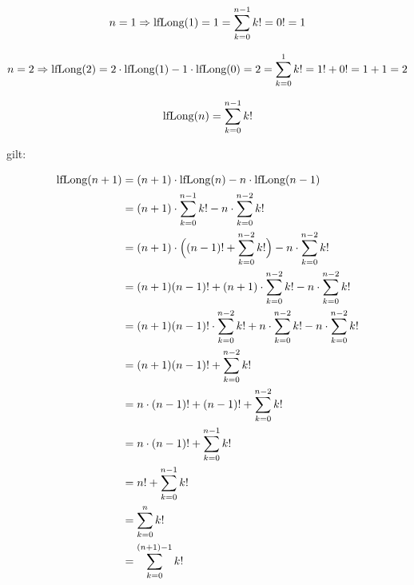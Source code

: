 \documentclass{lehramt-informatik-aufgabe}
\begin{document}
\begin{enumerate}
\begin{liAntwort}

%

\liInduktionAnfang

\begin{displaymath}
n=1 \Rightarrow
\text{lfLong}(1) =
1 =
\sum^{n-1}_{k=0}k! =
0! =
1
\end{displaymath}

\begin{displaymath}
n=2 \Rightarrow
\text{lfLong}(2) =
2 \cdot \text{lfLong}(1) - 1 \cdot \text{lfLong}(0) =
2 =
\sum^{1}_{k=0}k! =
1! + 0! =
1 + 1 =
2
\end{displaymath}

%

\liInduktionVoraussetzung

\begin{displaymath}
\text{lfLong}(n) = \sum^{n-1}_{k=0}k!
\end{displaymath}

gilt:

%

\liInduktionSchritt

\begin{equation}
\begin{split}
\text{lfLong}(n+1) & = (n+1) \cdot \text{lfLong}(n) - n \cdot \text{lfLong}(n-1) \\
& = (n+1) \cdot \sum^{n-1}_{k=0}k! - n \cdot \sum^{n-2}_{k=0}k! \\
& = (n+1) \cdot \Big((n-1)! + \sum^{n-2}_{k=0}k!\Big) - n \cdot \sum^{n-2}_{k=0}k! \\
& = (n+1)(n-1)! + (n+1) \cdot \sum^{n-2}_{k=0}k! - n \cdot \sum^{n-2}_{k=0}k! \\
& = (n+1)(n-1)! \cdot \sum^{n-2}_{k=0}k! + n \cdot \sum^{n-2}_{k=0}k! - n \cdot \sum^{n-2}_{k=0}k! \\
& = (n+1)(n-1)! + \sum^{n-2}_{k=0}k! \\
& = n \cdot (n-1)! + (n-1)! + \sum^{n-2}_{k=0}k! \\
& = n \cdot (n-1)! + \sum^{n-1}_{k=0}k! \\
& = n! + \sum^{n-1}_{k=0}k! \\
& = \sum^{n}_{k=0}k! \\
& = \sum^{(n+1)-1}_{k=0}k!
\end{split}
\end{equation}
\end{liAntwort}
\end{enumerate}
\end{document}
